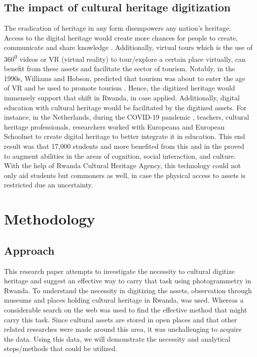 \documentclass[conference]{IEEEtran}
\begin{document}
\subsection{\textbf{The impact of cultural heritage digitization}}
The eradication of heritage in any form disempowers any nation's heritage. Access to the digital heritage would create more chances for people to create, communicate and share knowledge \cite{charter002}. Additionally, virtual tours
which is the use of 360\textsuperscript{0} videos or VR (virtual reality) to tour/explore a certain place virtually, can benefit from these assets and facilitate the sector of tourism. Notably, in the 1990s, Williams and Hobson, predicted
that tourism was about to enter the age of VR and be used to promote tourism \cite{Yang2021}. Hence, the digitized heritage would immensely support that shift in Rwanda, in case applied. Additionally, digital education with cultural heritage
would be facilitated by the digitized assets. For instance, in the Netherlands, during the COVID-19 pandemic \cite{eddig}, teachers, cultural heritage professionals, researchers worked with Europeana and European Schoolnet to create
digital heritage to better integrate it in education. This end result was that 17,000 students and more benefited from this and in the proved to augment abilities in the areas of cognition, social interaction, and culture.  With the help of
Rwanda Cultural Heritage Agency, this technology could not only aid students but commoners as well, in case the physical access to assets is restricted due an uncertainty. \\

\section{\textbf{Methodology}}
\subsection{Approach}
This research paper attempts to investigate the necessity to cultural digitize heritage and suggest an effective way to carry that task using photogrammetry in Rwanda. To understand the necessity in digitizing the assets, observation through museums and places holding cultural heritage in Rwanda, was used. Whereas a considerable search on the web was used to find the effective method that might carry this task. Since cultural assets are stored in open places and that other related researches were made around this area, it was unchallenging to acquire the data. Using this data, we will demonstrate the necessity and analytical steps/methods that could be utilized.
\end{document}
